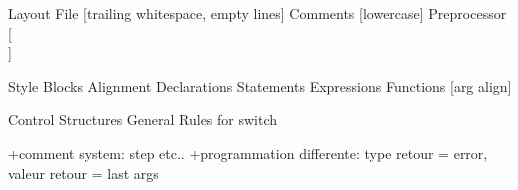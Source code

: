%
%

%
%

Layout
  File [trailing whitespace, empty lines]
  Comments [lowercase]
  Preprocessor [\\]

Style
  Blocks
  Alignment
  Declarations
  Statements
  Expressions
  Functions [arg align]

Control Structures
  General Rules
  for
  switch

+comment system: step etc..
+programmation differente: type retour = error, valeur retour = last args
